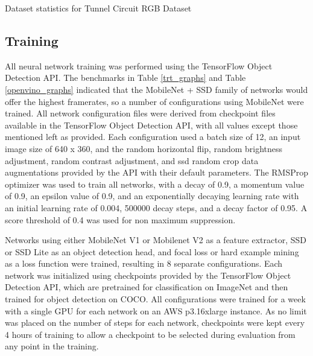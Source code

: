 
\begin{table}
	\centering
	\begin{adjustbox}{max width=.9\textwidth}
	\end{adjustbox}
	\caption{Dataset statistics for Tunnel Circuit RGB Dataset}
	\label{rgb_statistics}
\end{table}
 
\subsection{Training}

All neural network training was performed using the TensorFlow Object Detection API. The benchmarks in Table \ref{trt_graphs} and Table \ref{openvino_graphs} indicated that the MobileNet + SSD family of networks would offer the highest framerates, so a number of configurations using MobileNet were trained. All network configuration files were derived from checkpoint files available in the TensorFlow Object Detection API, with all values except those mentioned left as provided. Each configuration used a batch size of 12, an input image size of 640 x 360, and the random horizontal flip, random brightness adjustment, random contrast adjustment, and ssd random crop data augmentations provided by the API with their default parameters. The RMSProp optimizer was used to train all networks, with a decay of 0.9, a momentum value of 0.9, an epsilon value of 0.9, and an exponentially decaying learning rate with an initial learning rate of 0.004, 500000 decay steps, and a decay factor of 0.95. A score threshold of 0.4 was used for non maximum suppression.

Networks using either MobileNet V1 or Mobilenet V2 as a feature extractor, SSD or SSD Lite as an object detection head, and focal loss or hard example mining as a loss function were trained, resulting in 8 separate configurations. Each network was initialized using checkpoints provided by the TensorFlow Object Detection API, which are pretrained for classification on ImageNet and then trained for object detection on COCO. All configurations were trained for a week with a single GPU for each network on an AWS p3.16xlarge instance. As no limit was placed on the number of steps for each network, checkpoints were kept every 4 hours of training to allow a checkpoint to be selected during evaluation from any point in the training.

